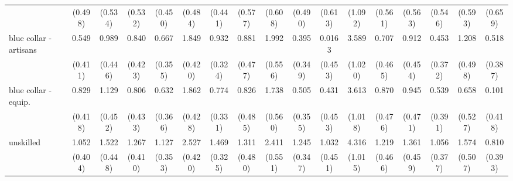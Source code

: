 {\begin{tabular}{l*{16}{c}}
                    &     (0.498)         &     (0.534)         &     (0.532)         &     (0.450)         &     (0.484)         &     (0.441)         &     (0.577)         &     (0.608)         &     (0.490)         &     (0.613)         &     (1.092)         &     (0.561)         &     (0.563)         &     (0.546)         &     (0.593)         &     (0.659)         \\
[1em]
blue collar - artisans&       0.549         &       0.989\sym{*}  &       0.840\sym{*}  &       0.667         &       1.849\sym{***}&       0.932\sym{**} &       0.881         &       1.992\sym{***}&       0.395         &      0.0163         &       3.589\sym{***}&       0.707         &       0.912\sym{*}  &       0.453         &       1.208\sym{*}  &       0.518         \\
                    &     (0.411)         &     (0.446)         &     (0.423)         &     (0.355)         &     (0.420)         &     (0.324)         &     (0.477)         &     (0.556)         &     (0.349)         &     (0.453)         &     (1.020)         &     (0.465)         &     (0.454)         &     (0.372)         &     (0.498)         &     (0.387)         \\
[1em]
blue collar - equip.&       0.829\sym{*}  &       1.129\sym{*}  &       0.806         &       0.632         &       1.862\sym{***}&       0.774\sym{*}  &       0.826         &       1.738\sym{**} &       0.505         &       0.431         &       3.613\sym{***}&       0.870         &       0.945\sym{*}  &       0.539         &       0.658         &       0.101         \\
                    &     (0.418)         &     (0.452)         &     (0.433)         &     (0.366)         &     (0.428)         &     (0.331)         &     (0.485)         &     (0.560)         &     (0.355)         &     (0.453)         &     (1.018)         &     (0.476)         &     (0.471)         &     (0.391)         &     (0.527)         &     (0.418)         \\
[1em]
unskilled           &       1.052\sym{**} &       1.522\sym{***}&       1.267\sym{**} &       1.127\sym{**} &       2.527\sym{***}&       1.469\sym{***}&       1.311\sym{**} &       2.411\sym{***}&       1.245\sym{***}&       1.032\sym{*}  &       4.316\sym{***}&       1.219\sym{**} &       1.361\sym{**} &       1.056\sym{**} &       1.574\sym{**} &       0.810\sym{*}  \\
                    &     (0.404)         &     (0.448)         &     (0.410)         &     (0.353)         &     (0.420)         &     (0.325)         &     (0.480)         &     (0.551)         &     (0.347)         &     (0.451)         &     (1.015)         &     (0.466)         &     (0.459)         &     (0.377)         &     (0.507)         &     (0.393)         \\

\end{tabular}}

